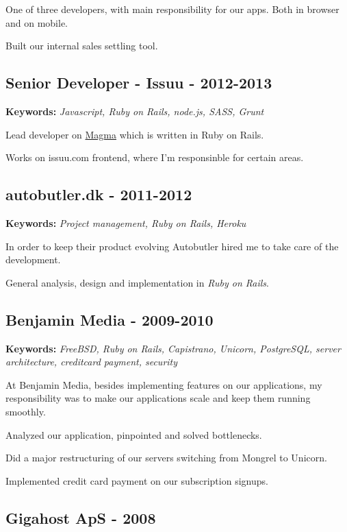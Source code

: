 \documentclass[a4paper]{article}
\renewenvironment{itemize}{
  \begin{list}{}
    { \setlength{\itemsep}{5pt}
      \setlength{\parsep}{0pt}
      \setlength{\topsep}{0pt}
      \setlength{\leftmargin}{0em} } }{
  \end{list}}
\newcommand{\keywords}[1]{\small\textbf{Keywords:} \emph{#1}\normalsize}
\begin{document}
One of three developers, with main responsibility for our apps. Both in browser and on mobile.

Built our internal sales settling tool.

\subsection*{Senior Developer - Issuu - 2012-2013}
\keywords{Javascript, Ruby on Rails, node.js, SASS, Grunt}

Lead developer on \href{http://www.magmahq.com}{Magma} which is written in Ruby on Rails.

Works on issuu.com frontend, where I'm responsinble for certain areas.

\subsection*{autobutler.dk - 2011-2012}
\keywords{Project management, Ruby on Rails, Heroku}

In order to keep their product evolving Autobutler hired me to take care of the development.

\begin{itemize}
	\item General analysis, design and implementation in \emph{Ruby on Rails}.
\end{itemize}

\subsection*{Benjamin Media - 2009-2010}

\keywords{FreeBSD, Ruby on Rails, Capistrano, Unicorn, PostgreSQL, server architecture, creditcard payment, security}

At Benjamin Media, besides implementing features on our applications, my responsibility was to make our applications scale and keep them running smoothly.

\begin{itemize}
	\item Analyzed our application, pinpointed and solved bottlenecks.
	\item Did a major restructuring of our servers switching from Mongrel to Unicorn.
	\item Implemented credit card payment on our subscription signups.
\end{itemize}

\subsection*{Gigahost ApS - 2008}
\end{document}
